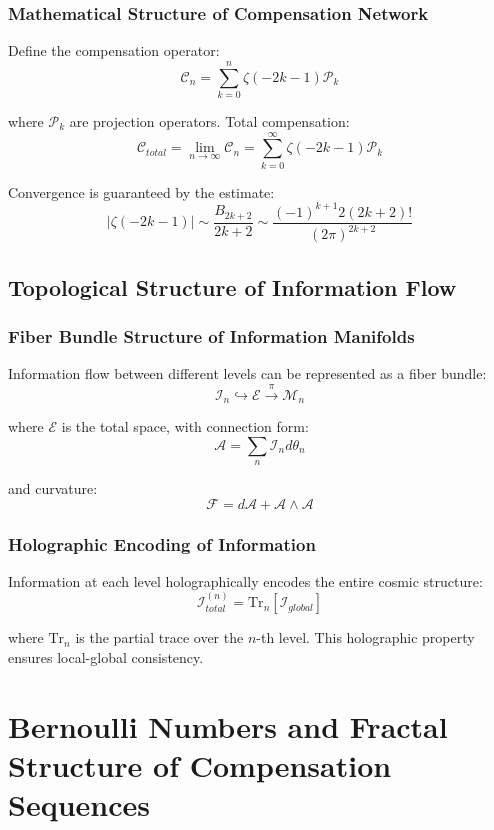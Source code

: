 \documentclass[11pt]{article}
\begin{document}
\subsubsection{Mathematical Structure of Compensation Network}

Define the compensation operator:
$$\mathcal{C}_n = \sum_{k=0}^n \zeta(-2k-1) \mathcal{P}_k$$

where $\mathcal{P}_k$ are projection operators. Total compensation:
$$\mathcal{C}_{total} = \lim_{n \to \infty} \mathcal{C}_n = \sum_{k=0}^{\infty} \zeta(-2k-1) \mathcal{P}_k$$

Convergence is guaranteed by the estimate:
$$|\zeta(-2k-1)| \sim \frac{B_{2k+2}}{2k+2} \sim \frac{(-1)^{k+1} 2(2k+2)!}{(2\pi)^{2k+2}}$$

\subsection{Topological Structure of Information Flow}

\subsubsection{Fiber Bundle Structure of Information Manifolds}

Information flow between different levels can be represented as a fiber bundle:
$$\mathcal{I}_n \hookrightarrow \mathcal{E} \xrightarrow{\pi} \mathcal{M}_n$$

where $\mathcal{E}$ is the total space, with connection form:
$$\mathcal{A} = \sum_n \mathcal{I}_n d\theta_n$$

and curvature:
$$\mathcal{F} = d\mathcal{A} + \mathcal{A} \wedge \mathcal{A}$$

\subsubsection{Holographic Encoding of Information}

Information at each level holographically encodes the entire cosmic structure:
$$\mathcal{I}_{total}^{(n)} = \text{Tr}_n[\mathcal{I}_{global}]$$

where $\text{Tr}_n$ is the partial trace over the $n$-th level. This holographic property ensures local-global consistency.

\section{Bernoulli Numbers and Fractal Structure of Compensation Sequences}
\end{document}
